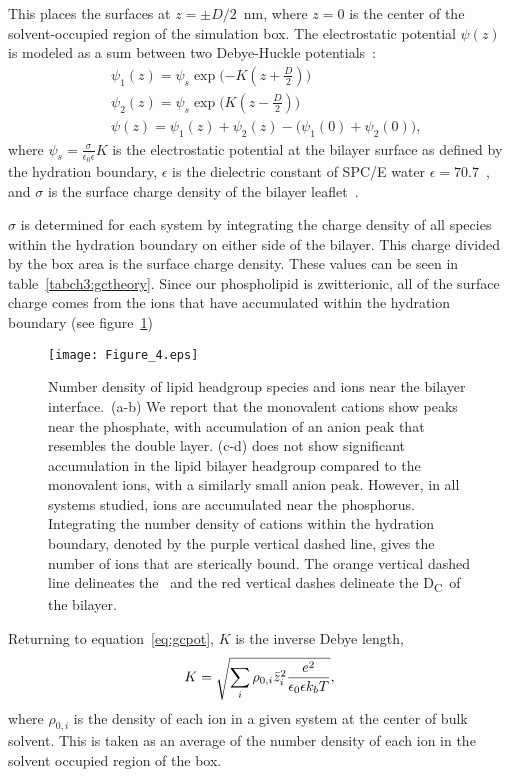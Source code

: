 This places the surfaces at $z=\pm D/2$~nm, where $z=0$ is the center of the solvent-occupied region of the simulation box.
The electrostatic potential $\psi(z)$ is modeled as a sum between two Debye-Huckle potentials~\cite{israelachvili:2011:intermol}:
\begin{align}
    &\psi_{1}(z) = \psi_s \exp\bigg({-K(z+\frac{D}{2})}\bigg)\\
    &\psi_{2}(z) = \psi_s \exp\bigg({K(z-\frac{D}{2})}\bigg)\\
    \label{eq:gcpot}
    &\psi(z) = \psi_1(z) + \psi_2(z) - \big({\psi_1(0)+\psi_2(0)}\big)\text{,}
\end{align}
where $\psi_s = \frac{\sigma}{\epsilon_0\epsilon} K$ is the electrostatic potential at the bilayer surface
as defined by the hydration boundary, $\epsilon$ 
is the dielectric constant of SPC/E water $\epsilon=70.7$~\cite{reddy:1989:dielectric}, and $\sigma$
is the surface charge density of the bilayer leaflet~\cite{israelachvili:2011:intermol}. 

$\sigma$ is determined for
each system by integrating the charge density of all species within the hydration boundary on either side of the bilayer.
This charge divided by the box area is the surface charge density.
These values can be seen in table~\ref{tabch3:gctheory}. {Since our
    phospholipid is zwitterionic, all of the surface charge comes from the
ions that have accumulated within 
the hydration boundary (see figure~\ref{figch3:dens})}
\begin{figure}[H]
    \caption[Number densities]{Number density of lipid headgroup species and
    ions near the bilayer interface.\ (a-b) We report that the 
    monovalent cations show peaks near the phosphate, with
    accumulation of an anion peak that resembles the double layer.
    (c-d) \mg{} does not show significant accumulation in the 
    lipid bilayer headgroup compared to the monovalent ions,
    with a similarly small anion peak. However, in all systems
    studied, ions are accumulated near the phosphorus.
    Integrating the number density of cations within the hydration boundary,
    denoted by the purple vertical dashed line, gives the number of ions that are
    sterically bound. The orange vertical dashed line delineates the \dhh~and the 
    red vertical dashes
delineate the D\textsubscript{C}~of the bilayer.}
\label{figch3:dens}
\texttt{[image: Figure\_4.eps]}
\end{figure}

Returning to equation~\ref{eq:gcpot}, $K$ is the inverse Debye length,
\begin{equation}
K=\sqrt{\sum_{i} \rho_{0,i} \bar z_i^2\frac{\text{\si{\elementarycharge}}^2}{\epsilon_0 \epsilon k_bT}},
\label{eq:debyelength}
\end{equation}
where $\rho_{0,i}$ is the density of each ion in a given system at the center of bulk solvent.
This is taken as an average of the number density of each ion in the solvent occupied region of the box.

